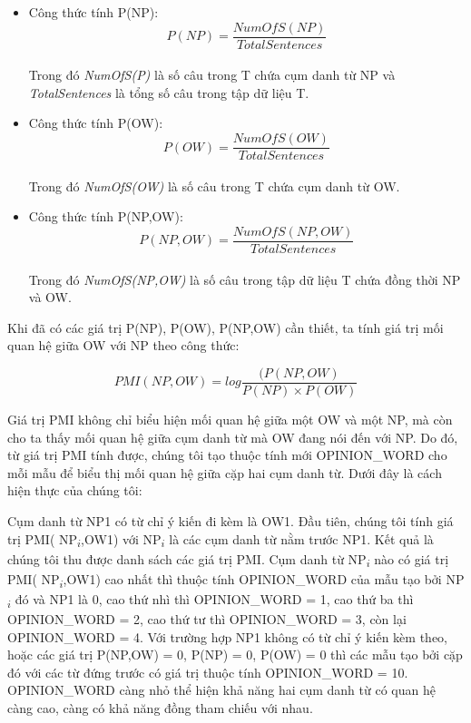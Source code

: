 \documentclass[12pt]{report}
\begin{document}
				\begin{itemize}
					\item{Công thức tính P(NP):
						\begin{equation*}
						P(NP) = \frac{NumOfS(NP)}{TotalSentences}
						\end{equation*}
					\\Trong đó \textit{NumOfS(P)} là số câu trong T chứa cụm danh từ NP và \textit{TotalSentences} là tổng số câu trong tập dữ liệu T.}
					\item{Công thức tính P(OW):
						\begin{equation*}
						P(OW) = \frac{NumOfS(OW)}{TotalSentences}
						\end{equation*}
					\\Trong đó \textit{NumOfS(OW)} là số câu trong T chứa cụm danh từ OW.}
					\item{Công thức tính P(NP,OW):
						\begin{equation*}
						P(NP,OW) = \frac{NumOfS(NP,OW)}{TotalSentences}
						\end{equation*}
					\\Trong đó \textit{NumOfS(NP,OW)} là số câu trong tập dữ liệu T chứa đồng thời NP và OW.}
				\end{itemize}
				\par Khi đã có các giá trị P(NP), P(OW), P(NP,OW) cần thiết, ta tính giá trị mối quan hệ giữa OW với NP theo công thức:
				\begin{center}
					\begin{equation*}
					PMI(NP,OW) = log\frac{(P(NP,OW)}{P(NP)\times P(OW)}
					\end{equation*}
				\end{center}
				\par Giá trị PMI không chỉ biểu hiện mối quan hệ giữa một OW và một NP, mà còn cho ta thấy mối quan hệ giữa cụm danh từ mà OW đang nói đến với NP. Do đó, từ giá trị PMI tính được, chúng tôi tạo thuộc tính mới OPINION\_WORD cho mỗi mẫu để biểu thị mối quan hệ giữa cặp hai cụm danh từ. Dưới đây là cách hiện thực của chúng tôi: 
				\par Cụm danh từ NP1 có từ chỉ ý kiến đi kèm là OW1. Đầu tiên, chúng tôi tính giá trị PMI( NP\textsubscript{$i$},OW1) với  NP\textsubscript{$i$} là các cụm danh từ nằm trước NP1. Kết quả là chúng tôi thu được danh sách các giá trị PMI. Cụm danh từ  NP\textsubscript{$i$} nào có giá trị PMI( NP\textsubscript{$i$},OW1) cao nhất thì thuộc tính OPINION\_WORD của mẫu tạo bởi  NP\textsubscript{$i$} đó và NP1 là 0, cao thứ nhì thì OPINION\_WORD = 1, cao thứ ba thì OPINION\_WORD = 2, cao thứ tư thì OPINION\_WORD = 3, còn lại OPINION\_WORD = 4. Với trường hợp NP1 không có từ chỉ ý kiến kèm theo, hoặc các giá trị P(NP,OW) = 0, P(NP) = 0, P(OW) = 0 thì  các mẫu tạo bởi cặp đó với các từ đứng trước có giá trị thuộc tính OPINION\_WORD = 10. OPINION\_WORD càng nhỏ thể hiện khả năng hai cụm danh từ có quan hệ càng cao, càng có khả năng đồng tham chiếu với nhau.
\end{document}

